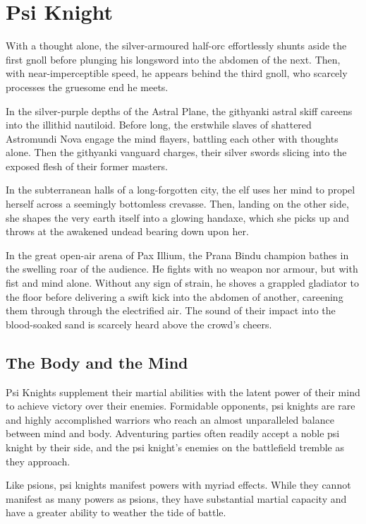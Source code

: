 \section{Psi Knight}
\label{sec:psi_knight}
\DndSetThemeColor[DmgCoral]
With a thought alone, the silver-armoured half-orc effortlessly
shunts aside the first gnoll before plunging his longsword
into the abdomen of the next.
Then, with near-imperceptible speed, he appears behind the third gnoll,
who scarcely processes the gruesome end he meets.

In the silver-purple depths of the Astral Plane,
the githyanki astral skiff careens into the illithid nautiloid.
Before long, the erstwhile slaves of shattered Astromundi Nova
engage the mind flayers,
battling each other with thoughts alone.
Then the githyanki vanguard charges,
their silver swords slicing into the exposed flesh of their former
masters.

In the subterranean halls of a long-forgotten city,
the elf uses her mind to propel herself across a seemingly
bottomless crevasse.
Then, landing on the other side,
she shapes the very earth itself into a glowing handaxe,
which she picks up and throws at the awakened undead
bearing down upon her.

In the great open-air arena of Pax Illium,
the Prana Bindu champion bathes in the swelling roar
of the audience.
He fights with no weapon nor armour,
but with fist and mind alone.
Without any sign of strain,
he shoves a grappled gladiator to the floor
before delivering a swift kick into the abdomen of another,
careening them through through the electrified air.
The sound of their impact into the blood-soaked sand
is scarcely heard above the crowd's cheers.

\subsection{The Body and the Mind}
Psi Knights supplement their martial abilities
with the latent power of their mind to
achieve victory over their enemies.
Formidable opponents,
psi knights are rare and highly accomplished warriors
who reach an almost unparalleled balance between mind
and body.
Adventuring parties often readily accept a noble psi knight
by their side,
and the psi knight's enemies on the battlefield tremble
as they approach.

Like psions, psi knights manifest powers with myriad effects.
While they cannot manifest as many powers as psions,
they have substantial martial capacity
and have a greater ability to weather the tide of battle. 

